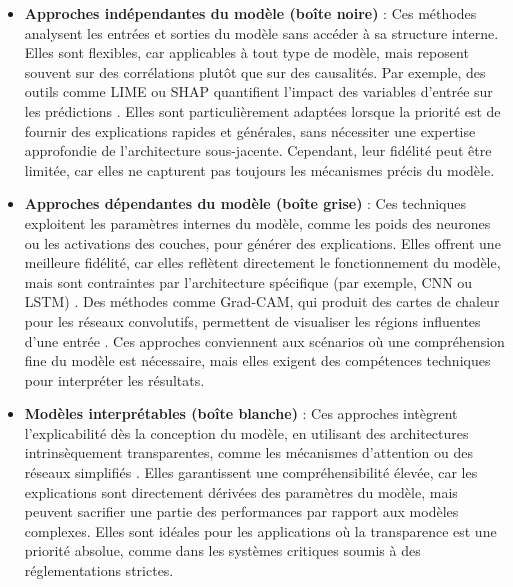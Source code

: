 \begin{itemize}
    \item \textbf{Approches indépendantes du modèle (boîte noire)} : Ces méthodes analysent les entrées et sorties du modèle sans accéder à sa structure interne. Elles sont flexibles, car applicables à tout type de modèle, mais reposent souvent sur des corrélations plutôt que sur des causalités. Par exemple, des outils comme LIME ou SHAP quantifient l'impact des variables d'entrée sur les prédictions \cite{guidotti2018}. Elles sont particulièrement adaptées lorsque la priorité est de fournir des explications rapides et générales, sans nécessiter une expertise approfondie de l'architecture sous-jacente. Cependant, leur fidélité peut être limitée, car elles ne capturent pas toujours les mécanismes précis du modèle.

    \item \textbf{Approches dépendantes du modèle (boîte grise)} : Ces techniques exploitent les paramètres internes du modèle, comme les poids des neurones ou les activations des couches, pour générer des explications. Elles offrent une meilleure fidélité, car elles reflètent directement le fonctionnement du modèle, mais sont contraintes par l'architecture spécifique (par exemple, CNN ou LSTM) \cite{jouis2020}. Des méthodes comme Grad-CAM, qui produit des cartes de chaleur pour les réseaux convolutifs, permettent de visualiser les régions influentes d’une entrée \cite{selvaraju2017gradcam}. Ces approches conviennent aux scénarios où une compréhension fine du modèle est nécessaire, mais elles exigent des compétences techniques pour interpréter les résultats.

    \item \textbf{Modèles interprétables (boîte blanche)} : Ces approches intègrent l'explicabilité dès la conception du modèle, en utilisant des architectures intrinsèquement transparentes, comme les mécanismes d'attention ou des réseaux simplifiés \cite{jouis2020}. Elles garantissent une compréhensibilité élevée, car les explications sont directement dérivées des paramètres du modèle, mais peuvent sacrifier une partie des performances par rapport aux modèles complexes. Elles sont idéales pour les applications où la transparence est une priorité absolue, comme dans les systèmes critiques soumis à des réglementations strictes.

\end{itemize}

